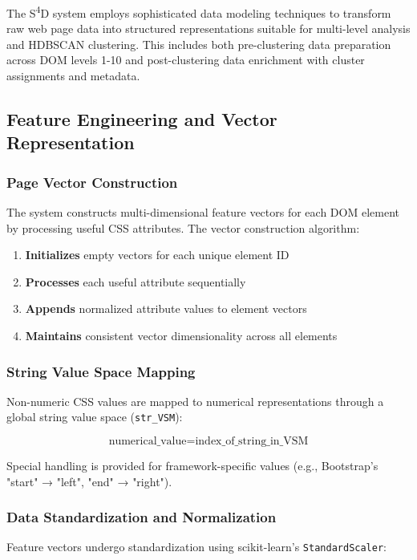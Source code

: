 The S\textsuperscript{4}D system employs sophisticated data modeling techniques to transform raw web page data into structured representations suitable for multi-level analysis and HDBSCAN clustering. This includes both pre-clustering data preparation across DOM levels 1-10 and post-clustering data enrichment with cluster assignments and metadata.

\subsection{Feature Engineering and Vector Representation}
\label{subsec:feature-engineering}

\subsubsection{Page Vector Construction}
The system constructs multi-dimensional feature vectors for each DOM element by processing useful CSS attributes. The vector construction algorithm:

\begin{enumerate}
    \item \textbf{Initializes} empty vectors for each unique element ID
    \item \textbf{Processes} each useful attribute sequentially
    \item \textbf{Appends} normalized attribute values to element vectors
    \item \textbf{Maintains} consistent vector dimensionality across all elements
\end{enumerate}

\subsubsection{String Value Space Mapping}
Non-numeric CSS values are mapped to numerical representations through a global string value space (\texttt{str\_VSM}):

\begin{equation}
\text{numerical\_value} = \text{index\_of\_string\_in\_VSM}
\end{equation}

Special handling is provided for framework-specific values (e.g., Bootstrap's "start" → "left", "end" → "right").

\subsubsection{Data Standardization and Normalization}
Feature vectors undergo standardization using scikit-learn's \texttt{StandardScaler}:

